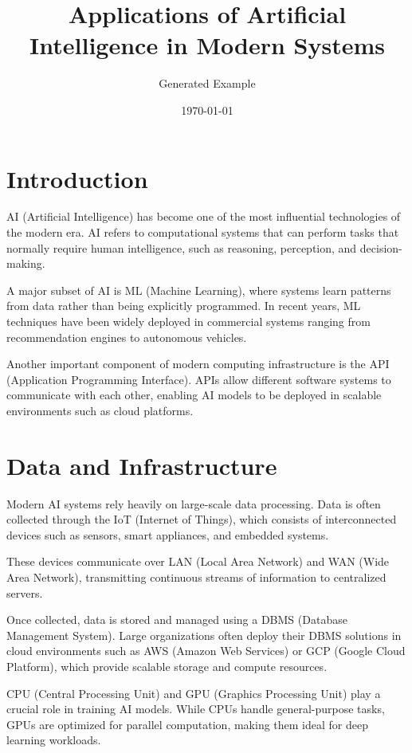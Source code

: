 \documentclass[11pt]{article}
\title{Applications of Artificial Intelligence in Modern Systems}
\author{Generated Example}
\date{\today}
\begin{document}
\maketitle
\onehalfspacing

\section{Introduction}

AI (Artificial Intelligence) has become one of the most influential technologies of the modern era. 
AI refers to computational systems that can perform tasks that normally require human intelligence, 
such as reasoning, perception, and decision-making.

A major subset of AI is ML (Machine Learning), where systems learn patterns from data rather than 
being explicitly programmed. In recent years, ML techniques have been widely deployed in commercial 
systems ranging from recommendation engines to autonomous vehicles.

Another important component of modern computing infrastructure is the API (Application Programming Interface). 
APIs allow different software systems to communicate with each other, enabling AI models to be deployed 
in scalable environments such as cloud platforms.

\section{Data and Infrastructure}

Modern AI systems rely heavily on large-scale data processing. Data is often collected through 
the IoT (Internet of Things), which consists of interconnected devices such as sensors, smart appliances, 
and embedded systems.

These devices communicate over  LAN (Local Area Network) and WAN (Wide Area Network), transmitting 
continuous streams of information to centralized servers.

Once collected, data is stored and managed using a DBMS (Database Management System). 
Large organizations often deploy their DBMS solutions in cloud environments such as AWS (Amazon Web Services)
or GCP (Google Cloud Platform), which provide scalable storage and compute resources.

CPU (Central Processing Unit) and GPU (Graphics Processing Unit) play a crucial role in training AI models. 
While CPUs handle general-purpose tasks, GPUs are optimized for parallel computation, making them ideal 
for deep learning workloads.
\end{document}
